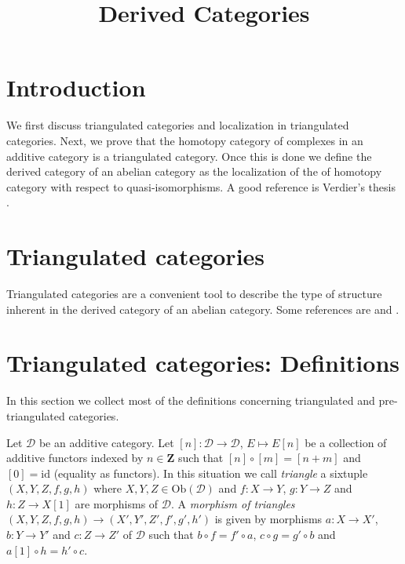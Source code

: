 

%


\title{Derived Categories}


\maketitle

\label{section-phantom}

\tableofcontents

\section{Introduction}
\label{section-introduction}

\noindent
We first discuss triangulated categories and localization in triangulated
categories. Next, we prove that the homotopy category of complexes in an
additive category is a triangulated category. Once this is done we define
the derived category of an abelian category as the localization of the
of homotopy category with respect to quasi-isomorphisms.
A good reference is Verdier's thesis \cite{Verdier}.



\section{Triangulated categories}
\label{section-triangulated-categories}

\noindent
Triangulated categories are a convenient tool to describe the type
of structure inherent in the derived category of an abelian category.
Some references are \cite{Verdier} and \cite{Neeman}.




\section{Triangulated categories: Definitions}
\label{section-triangulated-definitions}

\noindent
In this section we collect most of the definitions concerning triangulated
and pre-triangulated categories.

\begin{definition}
\label{definition-triangle}
Let $\mathcal{D}$ be an additive category.
Let $[n] : \mathcal{D} \to \mathcal{D}$, $E \mapsto E[n]$
be a collection of additive functors indexed by $n \in \mathbf{Z}$ such that
$[n] \circ [m] = [n + m]$  and $[0] = \text{id}$ (equality as functors).
In this situation
we call {\it triangle} a sixtuple $(X, Y, Z, f, g, h)$
where $X, Y, Z \in \text{Ob}(\mathcal{D})$ and
$f : X \to Y$, $g : Y \to Z$ and $h : Z \to X[1]$ are morphisms
of $\mathcal{D}$.
A {\it morphism of triangles}
$(X, Y, Z, f, g, h) \to (X', Y', Z', f', g', h')$
is given by morphisms $a : X \to X'$, $b : Y \to Y'$ and $c : Z \to Z'$
of $\mathcal{D}$ such that
$b \circ f = f' \circ a$, $c  \circ g = g' \circ b$ and
$a[1] \circ h = h' \circ c$.
\end{definition}

